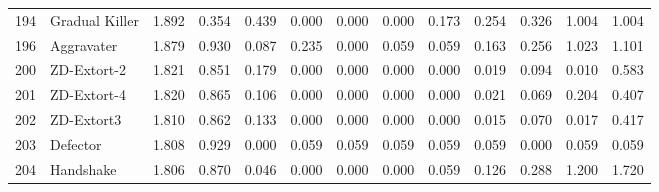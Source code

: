 \begin{tabular}{rlrrrrrrrrrrr}
  194 &         Gradual Killer &           1.892 &       0.354 &    0.439 &             0.000 &         0.000 &           0.000 &            0.173 &          0.254 &         0.326 &            1.004 &         1.004 \\
  196 &             Aggravater &           1.879 &       0.930 &    0.087 &             0.235 &         0.000 &           0.059 &            0.059 &          0.163 &         0.256 &            1.023 &         1.101 \\
  200 &            ZD-Extort-2 &           1.821 &       0.851 &    0.179 &             0.000 &         0.000 &           0.000 &            0.000 &          0.019 &         0.094 &            0.010 &         0.583 \\
  201 &            ZD-Extort-4 &           1.820 &       0.865 &    0.106 &             0.000 &         0.000 &           0.000 &            0.000 &          0.021 &         0.069 &            0.204 &         0.407 \\
  202 &             ZD-Extort3 &           1.810 &       0.862 &    0.133 &             0.000 &         0.000 &           0.000 &            0.000 &          0.015 &         0.070 &            0.017 &         0.417 \\
  203 &               Defector &           1.808 &       0.929 &    0.000 &             0.059 &         0.059 &           0.059 &            0.059 &          0.059 &         0.000 &            0.059 &         0.059 \\
  204 &              Handshake &           1.806 &       0.870 &    0.046 &             0.000 &         0.000 &           0.000 &            0.059 &          0.126 &         0.288 &            1.200 &         1.720 \\
\bottomrule
\end{tabular}
